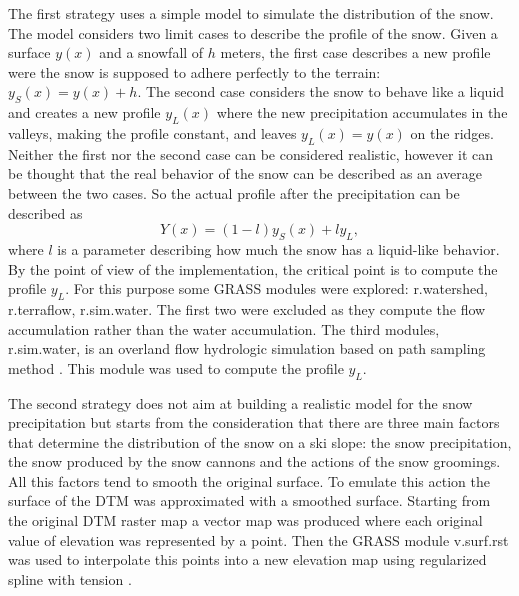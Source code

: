 \documentclass[12pt,a4paper,twoside]{book}
\begin{document}
The first strategy uses a simple model to simulate the distribution of the snow. The model considers two limit cases to describe the profile of the snow. Given a surface $y(x)$ and a snowfall of $h$ meters, the first case describes a new profile were the snow is supposed to adhere perfectly to the terrain: $y_S(x)=y(x)+h$. The second case considers the snow to behave like a liquid and creates a new profile $y_L(x)$ where the new precipitation accumulates in the valleys, making the profile constant, and leaves $y_L(x)=y(x)$ on the ridges. Neither the first nor the second case can be considered realistic, however it can be thought that the real behavior of the snow can be described as an average between the two cases. So the actual profile after the precipitation can be described as
\begin{equation}
Y(x)=(1-l)y_S(x)+ly_L,
\end{equation}
where $l$ is a parameter describing how much the snow has a liquid-like behavior. By the point of view of the implementation, the critical point is to compute the profile $y_L$. For this purpose some GRASS modules were explored: r.watershed, r.terraflow, r.sim.water. The first two were excluded as they compute the flow accumulation rather than the water accumulation. The third modules, r.sim.water, is an overland flow hydrologic simulation based on path sampling method \cite{mit2004}. This module was used to compute the profile $y_L$.

The second strategy does not aim at building a realistic model for the snow precipitation but starts from the consideration that there are three main factors that determine the distribution of the snow on a ski slope: the snow precipitation, the snow produced by the snow cannons and the actions of the snow groomings. All this factors tend to smooth the original surface. To emulate this action the surface of the DTM was approximated with a smoothed surface. Starting from the original DTM raster map a vector map was produced where each original value of elevation was represented by a point. Then the GRASS module v.surf.rst was used to interpolate this points into a new elevation map using regularized spline with tension \cite{mit2005}.
\end{document}

